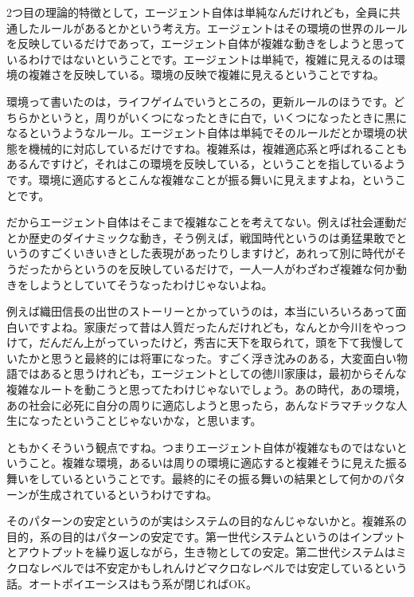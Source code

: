 \documentclass{ltjsbook}
\begin{document}
2つ目の理論的特徴として，エージェント自体は単純なんだけれども，全員に共通したルールがあるとかという考え方。エージェントはその環境の世界のルールを反映しているだけであって，エージェント自体が複雑な動きをしようと思っているわけではないということです。エージェントは単純で，複雑に見えるのは環境の複雑さを反映している。環境の反映で複雑に見えるということですね。

環境って書いたのは，ライフゲイムでいうところの，更新ルールのほうです。どちらかというと，周りがいくつになったときに白で，いくつになったときに黒になるというようなルール。エージェント自体は単純でそのルールだとか環境の状態を機械的に対応しているだけですね。複雑系は，複雑適応系と呼ばれることもあるんですけど，それはこの環境を反映している，ということを指しているようです。環境に適応するとこんな複雑なことが振る舞いに見えますよね，ということです。

だからエージェント自体はそこまで複雑なことを考えてない。例えば社会運動だとか歴史のダイナミックな動き，そう例えば，戦国時代というのは勇猛果敢でというのすごくいきいきとした表現があったりしますけど，あれって別に時代がそうだったからというのを反映しているだけで，一人一人がわざわざ複雑な何か動きをしようとしていてそうなったわけじゃないよね。

例えば織田信長の出世のストーリーとかっていうのは，本当にいろいろあって面白いですよね。家康だって昔は人質だったんだけれども，なんとか今川をやっつけて，だんだん上がっていったけど，秀吉に天下を取られて，頭を下て我慢していたかと思うと最終的には将軍になった。すごく浮き沈みのある，大変面白い物語ではあると思うけれども，エージェントとしての徳川家康は，最初からそんな複雑なルートを動こうと思ってたわけじゃないでしょう。あの時代，あの環境，あの社会に必死に自分の周りに適応しようと思ったら，あんなドラマチックな人生になったということじゃないかな，と思います。

ともかくそういう観点ですね。つまりエージェント自体が複雑なものではないということ。複雑な環境，あるいは周りの環境に適応すると複雑そうに見えた振る舞いをしているということです。最終的にその振る舞いの結果として何かのパターンが生成されているというわけですね。

そのパターンの安定というのが実はシステムの目的なんじゃないかと。複雑系の目的，系の目的はパターンの安定です。第一世代システムというのはインプットとアウトプットを繰り返しながら，生き物としての安定。第二世代システムはミクロなレベルでは不安定かもしれんけどマクロなレベルでは安定しているという話。オートポイエーシスはもう系が閉じればOK。
\end{document}
